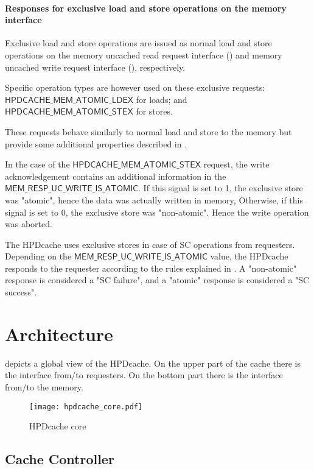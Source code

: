 \documentclass[10pt,titlepage,twoside]{book}
\begin{document}
\subsubsection{Responses for exclusive load and store operations on the memory interface}

Exclusive load and store operations are issued as normal load and store operations on the memory uncached read request interface () and memory uncached write request interface (), respectively.

Specific operation types are however used on these exclusive requests:
$\mathsf{HPDCACHE\_MEM\_ATOMIC\_LDEX}$ for loads; and $\mathsf{HPDCACHE\_MEM\_ATOMIC\_STEX}$ for stores.

These requests behave similarly to normal load and store to the memory but provide some additional properties described in .

In the case of the $\mathsf{HPDCACHE\_MEM\_ATOMIC\_STEX}$ request, the write acknowledgement contains an additional information in the $\mathsf{MEM\_RESP\_UC\_WRITE\_IS\_ATOMIC}$.
If this signal is set to 1, the exclusive store was "atomic", hence the data was actually written in memory,
Otherwise, if this signal is set to 0, the exclusive store was "non-atomic".
Hence the write operation was aborted.

The \ac{HPDcache} uses exclusive stores in case of \ac{SC} operations from requesters.
Depending on the $\mathsf{MEM\_RESP\_UC\_WRITE\_IS\_ATOMIC}$ value, the \ac{HPDcache} responds to the requester according to the rules explained in .
A "non-atomic" response is considered a "SC failure", and a "atomic" response is considered a "SC success".

\clearpage
\chapter{Architecture}
\minitoc
\newpage

 depicts a global view of the \ac{HPDcache}.
On the upper part of the cache there is the interface from/to requesters.
On the bottom part there is the interface from/to the memory.

\begin{figure}[htbp]
  \texttt{[image: hpdcache\_core.pdf]}
  \caption{HPDcache core}
\end{figure}

\section{Cache Controller}
\end{document}
